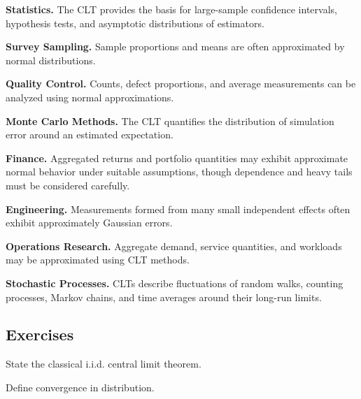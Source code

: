 \begin{applicationbox}

\textbf{Statistics.}
The CLT provides the basis for large-sample confidence intervals,
hypothesis tests, and asymptotic distributions of estimators.

\medskip

\textbf{Survey Sampling.}
Sample proportions and means are often approximated by normal
distributions.

\medskip

\textbf{Quality Control.}
Counts, defect proportions, and average measurements can be analyzed
using normal approximations.

\medskip

\textbf{Monte Carlo Methods.}
The CLT quantifies the distribution of simulation error around an
estimated expectation.

\medskip

\textbf{Finance.}
Aggregated returns and portfolio quantities may exhibit approximate
normal behavior under suitable assumptions, though dependence and heavy
tails must be considered carefully.

\medskip

\textbf{Engineering.}
Measurements formed from many small independent effects often exhibit
approximately Gaussian errors.

\medskip

\textbf{Operations Research.}
Aggregate demand, service quantities, and workloads may be approximated
using CLT methods.

\medskip

\textbf{Stochastic Processes.}
CLTs describe fluctuations of random walks, counting processes, Markov
chains, and time averages around their long-run limits.

\end{applicationbox}

\subsection{Exercises}
\label{subsec:clt-exercises}

\begin{exercise}[1]
State the classical i.i.d. central limit theorem.
\end{exercise}

\begin{exercise}[1]
Define convergence in distribution.
\end{exercise}

